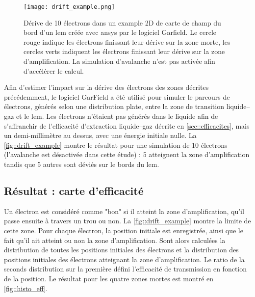                 \begin{wrapfigure}[22]{r}{0.4\textwidth}
                    \texttt{[image: drift\_example.png]}
                    \caption[Dérive de 10 électrons dans la carte de champ du bord d'un \gls{lem} avec Garfield.]{Dérive de 10 électrons dans un example 2D de carte de champ du bord d'un \gls{lem} créée avec \gls{ansys} par le logiciel Garfield. Le cercle rouge indique les électrons finissant leur dérive sur la zone morte, les cercles verts indiquent les électrons finissant leur dérive sur la zone d'amplification. La simulation d'avalanche n'est pas activée afin d'accélérer le calcul.}
                    \label{fig::drift_example}
                \end{wrapfigure}
                
                Afin d'estimer l'impact sur la dérive des électrons des zones décrites précédemment, le logiciel GarField \cite{garfield} a été utilisé pour simuler le parcours de  électrons, générés selon une distribution plate, entre la zone de transition liquide--gaz et le \gls{lem}. Les électrons n'étaient pas générés dans le liquide afin de s'affranchir de l'efficacité d'extraction liquide--gaz décrite en \autoref{sec::efficacites}, mais un demi-millimètre au dessus, avec une énergie initiale nulle. La \autoref{fig::drift_example} %
                montre le résultat pour une simulation de 10 électrons (l'avalanche est désactivée dans cette étude) : 5  atteignent la zone d'amplification tandis que 5 autres sont déviés sur le bords du \gls{lem}.
                
        \subsection{Résultat : carte d'efficacité}
        
            Un électron est considéré comme "bon" si il atteint la zone d'amplification, qu'il passe ensuite à travers un trou ou non. La \autoref{fig::drift_example} montre la limite de cette zone. Pour chaque électron, la position initiale est enregistrée, ainsi que le fait qu'il ait atteint ou non la zone d'amplification. Sont alors calculées la distribution de toutes les positions initiales des électrons et la distribution des positions initiales des électrons atteignant la zone d'amplification. Le ratio de la seconds distribution sur la première défini l'efficacité de transmission en fonction de la position. Le résultat pour les quatre zones mortes est montré en \autoref{fig::histo_eff}.
            
